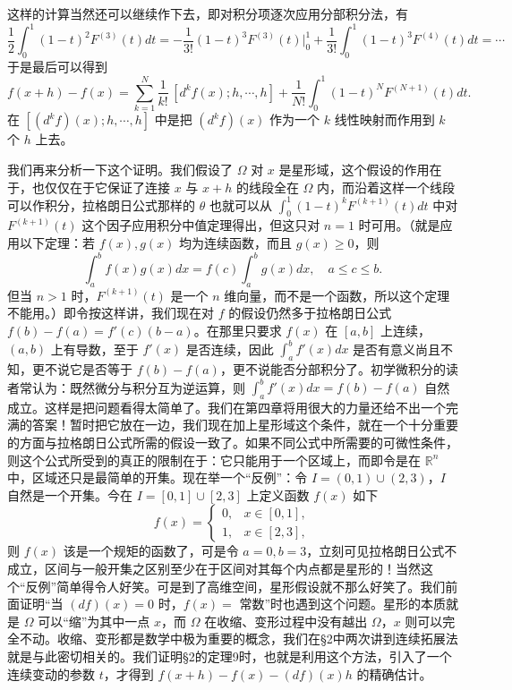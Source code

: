 这样的计算当然还可以继续作下去，即对积分项逐次应用分部积分法，有
\[
 \frac12\int_0^1(1-t)^2F^{(3)}(t)dt
 =-\frac1{3!}(1-t)^3F^{(3)}(t)\big|_0^1+\frac1{3!}\int_0^1(1-t)^3F^{(4)}(t)dt=\cdots
\]
于是最后可以得到
\begin{equation}
 f(x+h)-f(x)=\sum_{k=1}^N\frac1{k!}\,[d^kf(x);h,\cdots,h]
 +\frac1{N!}\int_0^1(1-t)^N F^{(N+1)}(t)dt.
 \tag{8}
\end{equation}
在 $[(d^kf)(x);h,\cdots,h]$ 中是把 $(d^kf)(x)$ 作为一个 $k$ 线性映射而作用到 $k$ 个 $h$ 上去。

我们再来分析一下这个证明。我们假设了 $\Omega$ 对 $x$ 是星形域，这个假设的作用在于，也仅仅在于它保证了连接 $x$ 与 $x+h$ 的线段全在 $\Omega$ 内，而沿着这样一个线段可以作积分，拉格朗日公式那样的 $\theta$ 也就可以从 $\int_0^1(1-t)^kF^{(k+1)}(t)dt$ 中对 $F^{(k+1)}(t)$ 这个因子应用积分中值定理得出，但这只对 $n=1$ 时可用。（就是应用以下定理：若 $f(x),g(x)$ 均为连续函数，而且 $g(x)\ge0$，则
\[
 \int_a^b f(x)g(x)dx=f(c)\int_a^b g(x)dx,\quad a\le c\le b.
\]
但当 $n>1$ 时，$F^{(k+1)}(t)$ 是一个 $n$ 维向量，而不是一个函数，所以这个定理不能用。）即令按这样讲，我们现在对 $f$ 的假设仍然多于拉格朗日公式 $f(b)-f(a)=f'(c)(b-a)$。在那里只要求 $f(x)$ 在 $[a,b]$ 上连续，$(a,b)$ 上有导数，至于 $f'(x)$ 是否连续，因此 $\int_a^b f'(x)dx$ 是否有意义尚且不知，更不说它是否等于 $f(b)-f(a)$，更不说能否分部积分了。初学微积分的读者常认为：既然微分与积分互为逆运算，则 $\int_a^b f'(x)dx=f(b)-f(a)$ 自然成立。这样是把问题看得太简单了。我们在第四章将用很大的力量还给不出一个完满的答案！暂时把它放在一边，我们现在加上星形域这个条件，就在一个十分重要的方面与拉格朗日公式所需的假设一致了。如果不同公式中所需要的可微性条件，则这个公式所受到的真正的限制在于：它只能用于一个区域上，而即令是在 $\mathbb R^n$ 中，区域还只是最简单的开集。现在举一个“反例”：令 $I=(0,1)\cup(2,3)$，$I$ 自然是一个开集。今在 $I=[0,1]\cup[2,3]$ 上定义函数 $f(x)$ 如下
\[
 f(x)=\begin{cases}
 0,&x\in[0,1],\\
 1,&x\in[2,3],
 \end{cases}
\]
则 $f(x)$ 该是一个规矩的函数了，可是令 $a=0,b=3$，立刻可见拉格朗日公式不成立，区间与一般开集之区别至少在于区间对其每个内点都是星形的！当然这个“反例”简单得令人好笑。可是到了高维空间，星形假设就不那么好笑了。我们前面证明“当 $(df)(x)=0$ 时，$f(x)=$ 常数”时也遇到这个问题。星形的本质就是 $\Omega$ 可以“缩”为其中一点 $x$，而 $\Omega$ 在收缩、变形过程中没有越出 $\Omega$，$x$ 则可以完全不动。收缩、变形都是数学中极为重要的概念，我们在§2中两次讲到连续拓展法就是与此密切相关的。我们证明§2的定理9时，也就是利用这个方法，引入了一个连续变动的参数 $t$，才得到 $f(x+h)-f(x)-(df)(x)h$ 的精确估计。


